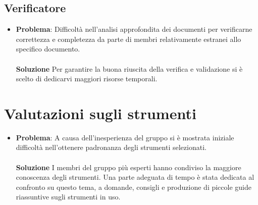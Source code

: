 \documentclass[openany,12pt,a4paper]{report}
\begin{document}
\subsection{Verificatore}

\begin{itemize}
	\item \textbf{Problema}: Difficoltà nell'analisi approfondita dei documenti per verificarne correttezza e completezza da parte di membri relativamente estranei allo specifico documento. \\ \\
	\textbf{Soluzione} Per garantire la buona riuscita della verifica e validazione si è scelto di dedicarvi maggiori risorse temporali.
\end{itemize}

\section{Valutazioni sugli strumenti}

\begin{itemize}
	\item \textbf{Problema}: A causa dell'inesperienza del gruppo si è mostrata iniziale difficoltà nell'ottenere padronanza degli strumenti selezionati. \\ \\
	\textbf{Soluzione} I membri del gruppo più esperti hanno condiviso la maggiore conoscenza degli strumenti. Una parte adeguata di tempo è stata dedicata al confronto su questo tema, a domande, consigli e produzione di piccole guide riassuntive sugli strumenti in uso.
\end{itemize}
\end{document}
